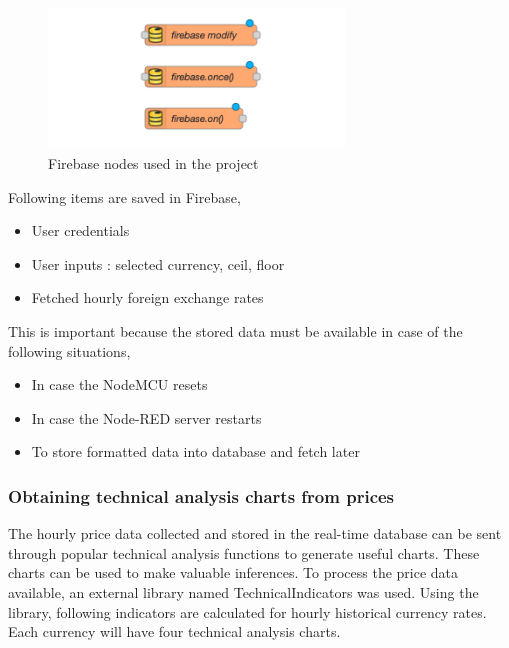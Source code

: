 \begin{figure}[H]
    \centering
      \includegraphics[width=0.7\textwidth]{images/firenodes.png}
    \caption{Firebase nodes used in the project}
    \label{fig:firenodes}
\end{figure}

Following items are saved in Firebase,

\begin{itemize}[itemsep=-1.7mm]
\item User credentials
\item User inputs : selected currency, ceil, floor
\item Fetched hourly foreign exchange rates
\end{itemize}


This is important because the stored data must be available in case of the following situations,

\begin{itemize}[itemsep=-1.7mm]
\item In case the NodeMCU resets
\item In case the Node-RED server restarts
\item To store formatted data into database and fetch later  
\end{itemize}

\subsubsection{Obtaining technical analysis charts from prices}

The hourly price data collected and stored in the real-time database can be sent through popular technical analysis functions to generate useful charts. These charts can be used to make valuable inferences. To process the price data available, an external library named TechnicalIndicators was used. Using the library, following indicators are calculated for hourly historical currency rates. Each currency will have four technical analysis charts.\\


